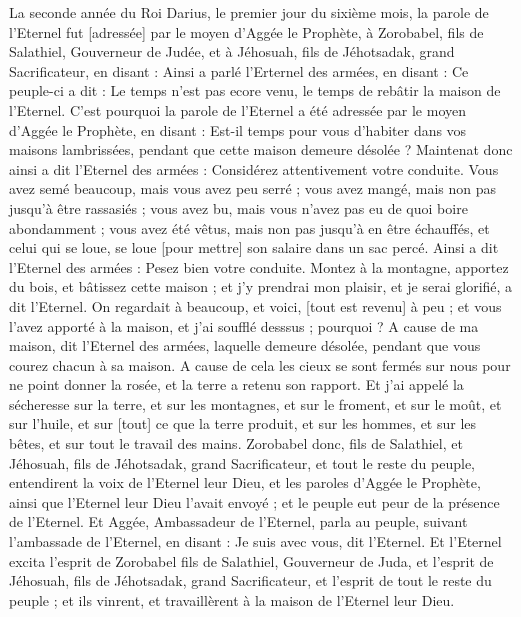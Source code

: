 \BFont
\begin{multicols}{2}
\VerseOne{}La seconde année du Roi Darius, le premier jour du sixième mois, la parole de l'Eternel fut [adressée] par le moyen d'Aggée le Prophète, à Zorobabel, fils de Salathiel, Gouverneur de Judée, et à Jéhosuah, fils de Jéhotsadak, grand Sacrificateur, en disant :
Ainsi a parlé l'Erternel des armées, en disant : Ce peuple-ci a dit : Le temps n'est pas ecore venu, le temps de rebâtir la maison de l'Eternel.
C'est pourquoi la parole de l'Eternel a été adressée par le moyen d'Aggée le Prophète, en disant :
Est-il temps pour vous d'habiter dans vos maisons lambrissées, pendant que cette maison demeure désolée ?
Maintenat donc ainsi a dit l'Eternel des armées : Considérez attentivement votre conduite.
Vous avez semé beaucoup, mais vous avez peu serré ; vous avez mangé, mais non pas jusqu'à être rassasiés ; vous avez bu, mais vous n'avez pas eu de quoi boire abondamment ; vous avez été vêtus, mais non pas jusqu'à en être échauffés, et celui qui se loue, se loue [pour mettre] son salaire dans un sac percé.
Ainsi a dit l'Eternel des armées : Pesez bien votre conduite.
Montez à la montagne, apportez du bois, et bâtissez cette maison ; et j'y prendrai mon plaisir, et je serai glorifié, a dit l'Eternel.
On regardait à beaucoup, et voici, [tout est revenu] à peu ; et vous l'avez apporté à la maison, et j'ai soufflé desssus ; pourquoi ? A cause de ma maison, dit l'Eternel des armées, laquelle demeure désolée, pendant que vous courez chacun à sa maison.
A cause de cela les cieux se sont fermés sur nous pour ne point donner la rosée, et la terre a retenu son rapport.
Et j'ai appelé la sécheresse sur la terre, et sur les montagnes, et sur le froment, et sur le moût, et sur l'huile, et sur [tout] ce que la terre produit, et sur les hommes, et sur les bêtes, et sur tout le travail des mains.
Zorobabel donc, fils de Salathiel, et Jéhosuah, fils de Jéhotsadak, grand Sacrificateur, et tout le reste du peuple, entendirent la voix de l'Eternel leur Dieu, et les paroles d'Aggée le Prophète, ainsi que l'Eternel leur Dieu l'avait envoyé ; et le peuple eut peur de la présence de l'Eternel.
Et Aggée, Ambassadeur de l'Eternel, parla au peuple, suivant l'ambassade de l'Eternel, en disant : Je suis avec vous, dit l'Eternel.
Et l'Eternel excita l'esprit de Zorobabel fils de Salathiel, Gouverneur de Juda, et l'esprit de Jéhosuah, fils de Jéhotsadak, grand Sacrificateur, et l'esprit de tout le reste du peuple ; et ils vinrent, et travaillèrent à la maison de l'Eternel leur Dieu.

\end{multicols}
